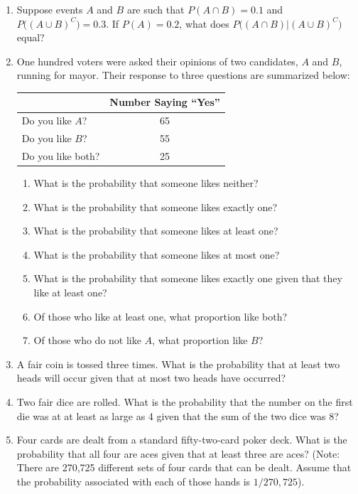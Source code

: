 \documentclass{article}
\begin{document}
\begin{enumerate}
\begin{solution}
    \end{solution}
    \item Suppose events \(A\) and \(B\) are such that \(P(A\cap{}B) = 0.1\) and \(P\bigl({(A\cup{}B)}^C\bigr)=0.3\). If \(P(A) =0.2\), what does \(P\bigl((A\cap{}B)|{(A\cup{}B)}^C\bigr)\) equal?\begin{solution}
        
    \end{solution}
    \item One hundred voters were asked their opinions of two candidates, \(A\) and \(B\), running for mayor. Their response to three questions are summarized below:\begin{center}
        \begin{tabular}{lc}
            \toprule
            & \textbf{Number Saying ``Yes''} \\
            \midrule
            Do you like \(A\)? & 65 \\ 
            Do you like \(B\)? & 55 \\ 
            Do you like both? & 25 \\
            \bottomrule
        \end{tabular}
    \end{center}\begin{enumerate}
        \item What is the probability that someone likes neither?
        \item What is the probability that someone likes exactly one? 
        \item What is the probability that someone likes at least one? 
        \item What is the probability that someone likes at most one? 
        \item What is the probability that someone likes exactly one given that they like at least one? 
        \item Of those who like at least one, what proportion like both? 
        \item Of those who do not like \(A\), what proportion like \(B\)?
    \end{enumerate}
    \item A fair coin is tossed three times. What is the probability that at least two heads will occur given that at most two heads have occurred? 
    \item Two fair dice are rolled. What is the probability that the number on the first die was at at least as large as 4 given that the sum of the two dice was 8? 
    \item Four cards are dealt from a standard fifty-two-card poker deck. What is the probability that all four are aces given that at least three are aces? (Note: There are 270,725 different 
    sets of four cards that can be dealt. Assume that the probability associated with each of those hands is \(1/270,725\)).
\end{enumerate}
\end{document}

